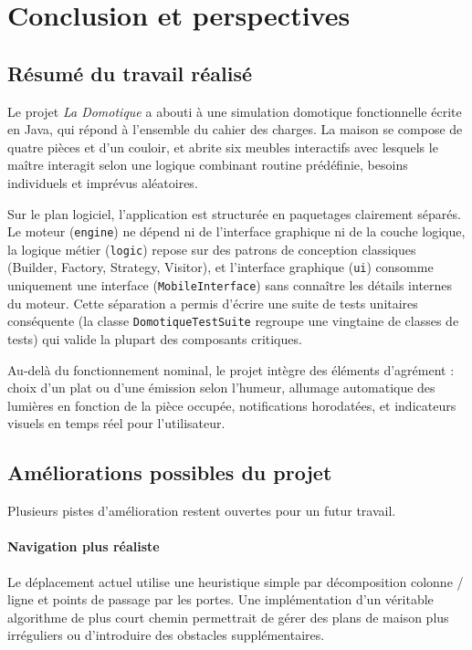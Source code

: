 \newpage
\section{Conclusion et perspectives}
\label{sec:bilan}

\subsection{Résumé du travail réalisé}

Le projet \textit{La Domotique} a abouti à une simulation domotique fonctionnelle écrite en Java, qui répond à l'ensemble du cahier des charges. La maison se compose de quatre pièces et d'un couloir, et abrite six meubles interactifs avec lesquels le maître interagit selon une logique combinant routine prédéfinie, besoins individuels et imprévus aléatoires.

Sur le plan logiciel, l'application est structurée en paquetages clairement séparés. Le moteur (\texttt{engine}) ne dépend ni de l'interface graphique ni de la couche logique, la logique métier (\texttt{logic}) repose sur des patrons de conception classiques (Builder, Factory, Strategy, Visitor), et l'interface graphique (\texttt{ui}) consomme uniquement une interface (\texttt{MobileInterface}) sans connaître les détails internes du moteur. Cette séparation a permis d'écrire une suite de tests unitaires conséquente (la classe \texttt{DomotiqueTestSuite} regroupe une vingtaine de classes de tests) qui valide la plupart des composants critiques.

Au-delà du fonctionnement nominal, le projet intègre des éléments d'agrément : choix d'un plat ou d'une émission selon l'humeur, allumage automatique des lumières en fonction de la pièce occupée, notifications horodatées, et indicateurs visuels en temps réel pour l'utilisateur.

\subsection{Améliorations possibles du projet}

Plusieurs pistes d'amélioration restent ouvertes pour un futur travail.

\paragraph{Navigation plus réaliste} Le déplacement actuel utilise une heuristique simple par décomposition colonne / ligne et points de passage par les portes. Une implémentation d'un véritable algorithme de plus court chemin permettrait de gérer des plans de maison plus irréguliers ou d'introduire des obstacles supplémentaires.

